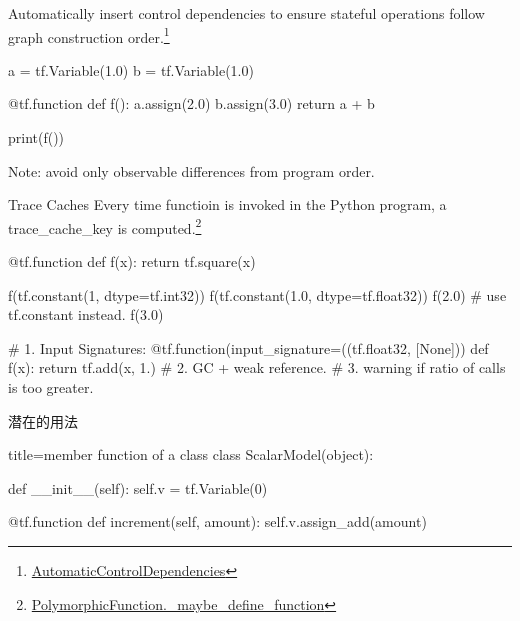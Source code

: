 \begin{frame}[fragile]
    Automatically insert control dependencies to ensure stateful operations follow graph construction order.\footnote{\href{https://github.com/tensorflow/tensorflow/blob/8c072a519e2beed483adb361a9be934a47bee366/tensorflow/python/framework/auto_control_deps.py\#L31}{AutomaticControlDependencies}}

    \begin{tcblisting}{}
        a = tf.Variable(1.0)
        b = tf.Variable(1.0)

        @tf.function
        def f():
          a.assign(2.0)
          b.assign(3.0)
          return a + b

        print(f())
    \end{tcblisting}

    Note: avoid only observable differences from program order.
\end{frame}

\begin{frame}[fragile]{Trace Caches}
    Every time functioin is invoked in the Python program, a trace\_cache\_key is computed.\footnote{\href{https://github.com/tensorflow/tensorflow/blob/8c072a519e2beed483adb361a9be934a47bee366/tensorflow/python/eager/function.py\#L884}{PolymorphicFunction.\_maybe\_define\_function}}

    \begin{tcblisting}{}
        @tf.function
        def f(x):
          return tf.square(x)

        f(tf.constant(1, dtype=tf.int32))
        f(tf.constant(1.0, dtype=tf.float32))
        f(2.0)  # use tf.constant instead.
        f(3.0)

        # 1. Input Signatures:
        @tf.function(input_signature=((tf.float32, [None]))
        def f(x):
          return tf.add(x, 1.)
        # 2. GC + weak reference.
        # 3. warning if ratio of calls is too greater.
    \end{tcblisting}
\end{frame}

\begin{frame}[fragile]{潜在的用法}
    \begin{tcblisting}{title=member function of a class}
        class ScalarModel(object):

          def __init__(self):
            self.v = tf.Variable(0)

          @tf.function
          def increment(self, amount):
            self.v.assign_add(amount)
    \end{tcblisting}
\end{frame}

